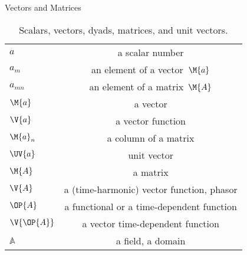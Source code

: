 \documentclass[xcolor=dvipsnames, aspectratio=169, handout, intlimits]{beamer}
\begin{document}
\begin{frame}{Vectors and Matrices}

\vspace{-1cm}
\begin{table}
\begin{center}
\caption{Scalars, vectors, dyads, matrices, and unit vectors.}
\begin{tabular}{lc}
\toprule 
$a$ & a scalar number \\ 
$a_m$ & an element of a vector~$\M{a}$ \\
$a_{mn}$ & an element of a matrix~$\M{A}$ \\
$\M{a}$	& a vector \\
$\V{a}$	& a vector function \\
$\M{a}_n$& a column of a matrix \\
$\UV{a}$ & unit vector \\ 
$\M{A}$	& a matrix \\ 
$\V{A}$	& a (time-harmonic) vector function, phasor \\ 
$\OP{A}$ & a functional or a time-dependent function \\ 
$\V{\OP{A}}$ & a vector time-dependent function \\ 
$\mathbb{A}$ & a field, a domain \\
\bottomrule
\end{tabular} 
\end{center}
\end{table}

\end{frame}
\end{document}
